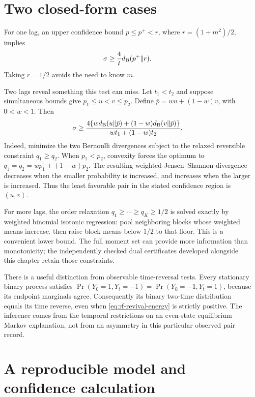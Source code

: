 \section{Two closed-form cases}

For one lag, an upper confidence bound $p\le p^+<r$, where
$r=(1+m^2)/2$, implies
\begin{equation}
 \sigma\ge \frac{4}{t}d_{\rm B}(p^+\Vert r).
 \label{eq:rf-single-energy}
\end{equation}
Taking $r=1/2$ avoids the need to know $m$.

Two lags reveal something this test can miss. Let $t_1<t_2$ and suppose
simultaneous bounds give $p_1\le u<v\le p_2$. Define
$\bar p=wu+(1-w)v$, with $0<w<1$. Then
\begin{equation}
 \sigma\ge
 \frac{4\{w d_{\rm B}(u\Vert\bar p)
 +(1-w)d_{\rm B}(v\Vert\bar p)\}}
 {wt_1+(1-w)t_2}.
 \label{eq:rf-revival-energy}
\end{equation}
Indeed, minimize the two Bernoulli divergences subject to the relaxed
reversible constraint $q_1\ge q_2$. When $p_1<p_2$, convexity forces the
optimum to $q_1=q_2=wp_1+(1-w)p_2$. The resulting weighted
Jensen--Shannon divergence decreases when the smaller probability is
increased, and increases when the larger is increased. Thus the least
favorable pair in the stated confidence region is $(u,v)$.

For more lags, the order relaxation
$q_1\ge\cdots\ge q_K\ge1/2$ is solved exactly by weighted binomial
isotonic regression: pool neighboring blocks whose weighted means increase,
then raise block means below $1/2$ to that floor. This is a convenient lower
bound. The full moment set can provide more information than monotonicity;
the independently checked dual certificates developed alongside this chapter
retain those constraints.

There is a useful distinction from observable time-reversal tests. Every
stationary binary process satisfies
$\Pr(Y_0=1,Y_t=-1)=\Pr(Y_0=-1,Y_t=1)$, because its endpoint marginals agree.
Consequently its binary two-time distribution equals its time reverse,
even when \eqref{eq:rf-revival-energy} is strictly positive. The inference
comes from the temporal restrictions on an even-state equilibrium Markov
explanation, not from an asymmetry in this particular observed pair record.

\section{A reproducible model and confidence calculation}

